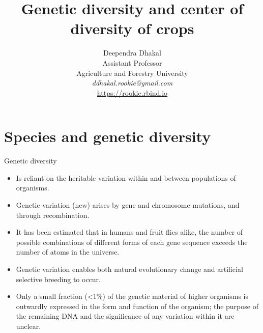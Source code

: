 \documentclass[
  ignorenonframetext,
  aspectratio=169]{beamer}
\title{Genetic diversity and center of diversity of crops}
\author{Deependra Dhakal\\
Assistant Professor\\
Agriculture and Forestry University\\
\textit{ddhakal.rookie@gmail.com}\\
\url{https://rookie.rbind.io}}
\date{}
\providecommand{\tightlist}{%
  \setlength{\itemsep}{0pt}\setlength{\parskip}{0pt}}
\begin{document}
\frame{\titlepage}

\begin{frame}[allowframebreaks]
  \tableofcontents[hideallsubsections]
\end{frame}
\hypertarget{species-and-genetic-diversity}{%
\section{Species and genetic
diversity}\label{species-and-genetic-diversity}}

\begin{frame}{Genetic diversity}
\protect\hypertarget{genetic-diversity}{}
\begin{itemize}
\tightlist
\item
  Is reliant on the heritable variation within and between populations
  of organisms.
\item
  Genetic variation (new) arises by gene and chromosome mutations, and
  through recombination.
\item
  It has been estimated that in humans and fruit flies alike, the number
  of possible combinations of different forms of each gene sequence
  exceeds the number of atoms in the universe.
\item
  Genetic variation enables both natural evolutionary change and
  artificial selective breeding to occur.
\item
  Only a small fraction (\textless1\%) of the genetic material of higher
  organisms is outwardly expressed in the form and function of the
  organism; the purpose of the remaining DNA and the significance of any
  variation within it are unclear.
\end{itemize}
\end{frame}
\end{document}

